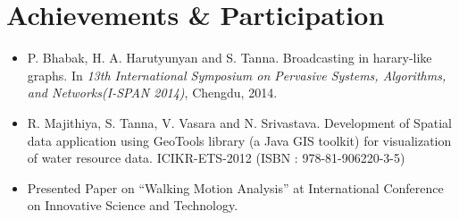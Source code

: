 \documentclass[12pt,a4paper,sans]{moderncv} %
\begin{document}
\section{Achievements \& Participation}
\begin{itemize}
\item P. Bhabak, H. A. Harutyunyan and S. Tanna. Broadcasting in harary-like graphs. In \textit{13th International Symposium on Pervasive Systems, Algorithms, and Networks(I-SPAN 2014)}, Chengdu, 2014. \\
\item 	R. Majithiya, S. Tanna, V. Vasara and N. Srivastava. Development of Spatial data application using GeoTools library (a Java GIS toolkit) for visualization of water resource data. ICIKR-ETS-2012 (ISBN : 978-81-906220-3-5) \\
\item Presented Paper on ``Walking Motion Analysis'' at International Conference on Innovative Science and Technology.

\end{itemize}



\end{document}
